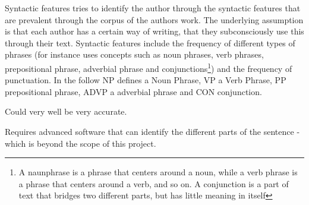 {\label{syntactic}
Syntactic features tries to identify the author through the syntactic
features that are prevalent through the corpus of the authors
work. The underlying assumption is that each author has a certain way of writing, that they subconsciously use this through their text. Syntactic features include the frequency of different types of phrases (for instance \cite{style} uses concepts such as noun phrases, verb phrases, prepositional phrase, adverbial phrase and conjunctions\footnote{A naunphrase is a phrase that centers around a noun, while a verb phrase is a phrase that centers around a verb, and so on. A conjunction is a part of text that bridges two different parts, but has little meaning in itself}) and the frequency of punctuation.
} 
{
In the follow NP defines a Noun Phrase, VP a Verb Phrase, PP prepositional phrase, ADVP a adverbial phrase and CON conjunction.\\
}
{
\item Could very well be very accurate.
}{
\item Requires advanced software that can identify the different parts of the sentence - which is beyond the scope of this project.

}

